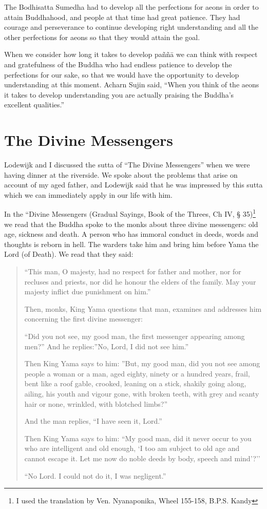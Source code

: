 The Bodhisatta Sumedha had to develop all the perfections for aeons in order to attain Buddhahood, and people at that time had great patience. They had courage and perseverance to continue developing right understanding and all the other perfections for aeons so that they would attain the goal.

When we consider how long it takes to develop paññā we can think with respect and gratefulness of the Buddha who had endless patience to develop the perfections for our sake, so that we would have the opportunity to develop understanding at this moment. Acharn Sujin said, ``When you think of the aeons it takes to develop understanding you are actually praising the Buddha’s excellent qualities.''





\chapter{The Divine Messengers}


Lodewijk and I discussed the sutta of ``The Divine Messengers'' when we were having dinner at the riverside. We spoke about the problems that arise on account of my aged father, and Lodewijk said that he was impressed by this sutta which we can immediately apply in our life with him.

In the ``Divine Messengers (Gradual Sayings, Book of the Threes, Ch IV, § 35)\footnote{I used the translation by Ven. Nyanaponika, Wheel 155-158, B.P.S. Kandy} we read that the Buddha spoke to the monks about three divine messengers: old age, sickness and death. A person who has immoral conduct in deeds, words and thoughts is reborn in hell. The warders take him and bring him before Yama the Lord (of Death). We read that they said:

\begin{quote}

``This man, O majesty, had no respect for father and mother, nor for recluses and priests, nor did he honour the elders of the family. May your majesty inflict due punishment on him.''

Then, monks, King Yama questions that man, examines and addresses him concerning the first divine messenger:

``Did you not see, my good man, the first messenger appearing among men?''
And he replies:''No, Lord, I did not see him.''

Then King Yama says to him: ''But, my good man, did you not see among people a woman or a man, aged eighty, ninety or a hundred years, frail, bent like a roof gable, crooked, leaning on a stick, shakily going along, ailing, his youth and vigour gone, with broken teeth, with grey and scanty hair or none, wrinkled, with blotched limbs?''

And the man replies, ``I have seen it, Lord.''

Then King Yama says to him: ``My good man, did it never occur to you who are intelligent and old enough, `I too am subject to old age and cannot escape it. Let me now do noble deeds by body, speech and mind’?''

``No Lord. I could not do it, I was negligent.''
\end{quote}



